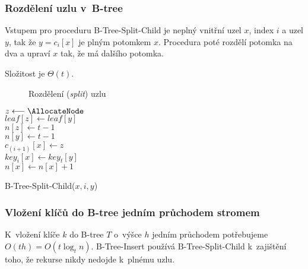 \subsubsection{Rozdělení uzlu v~B-tree}

Vstupem pro proceduru B-Tree-Split-Child je neplný vnitřní uzel $x$,
index $i$ a uzel $y$, tak že $y=c_{i}[x]$ je plným potomkem $x$\@.
Procedura poté rozdělí potomka na dva a upraví $x$ tak, že má dalšího
potomka.

Složitost je $\Theta(t)$\@.

\begin{figure}[t]
\caption{Rozdělení (\emph{split}) uzlu}
\end{figure}


\begin{algorithm}[t]
\SetAlgoLined
{}

{$z \longleftarrow \AllocateNode$}\\
{$leaf[z] \longleftarrow leaf[y]$}\\
{$n[z] \longleftarrow t-1$}\\
$n[y] \longleftarrow t-1$\\
$c_{(i+1)}[x] \longleftarrow z$\\
$key_i[x] \longleftarrow key_t[y]$\\
$n[x] \longleftarrow n[x]+1$
\caption{B-Tree-Split-Child($x, i, y$)}
\end{algorithm}



\subsubsection{Vložení klíčů do B-tree jedním průchodem stromem}

K~vložení klíče $k$ do B-tree $T$ o~výšce $h$ jedním průchodem
potřebujeme $O(th)=O(t\log_{t}n)$\@. B-Tree-Insert používá B-Tree-Split-Child
k~zajištění toho, že rekurse nikdy nedojde k~plnému uzlu\@.

